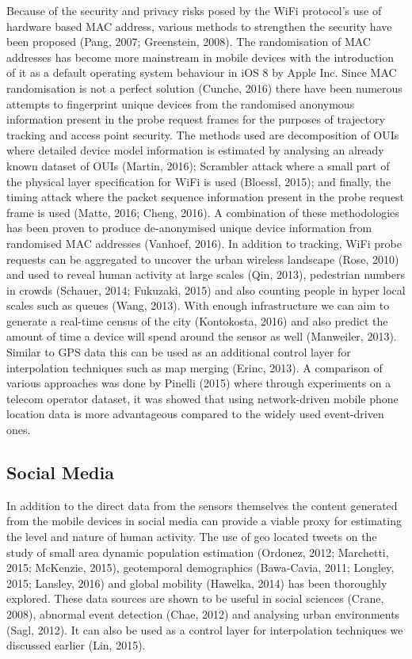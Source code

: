 Because of the security and privacy risks posed by the WiFi protocol’s use of hardware based MAC address, various methods to strengthen the security have been proposed (Pang, 2007; Greenstein, 2008).
The randomisation of MAC addresses has become more mainstream in mobile devices with the introduction of it as a default operating system behaviour in iOS 8 by Apple Inc.
Since MAC randomisation is not a perfect solution (Cunche, 2016) there have been numerous attempts to fingerprint unique devices from the randomised anonymous information present in the probe request frames for the purposes of trajectory tracking and access point security.
The methods used are decomposition of OUIs where detailed device model information is estimated by analysing an already known dataset of OUIs (Martin, 2016); Scrambler attack where a small part of the physical layer specification for WiFi is used (Bloessl, 2015); and finally, the timing attack where the packet sequence information present in the probe request frame is used (Matte, 2016; Cheng, 2016).
A combination of these methodologies has been proven to produce de-anonymised unique device information from randomised MAC addresses (Vanhoef, 2016).
In addition to tracking, WiFi probe requests can be aggregated to uncover the urban wireless landscape (Rose, 2010) and used to reveal human activity at large scales (Qin, 2013), pedestrian numbers in crowds (Schauer, 2014; Fukuzaki, 2015) and also counting people in hyper local scales such as queues (Wang, 2013).
With enough infrastructure we can aim to generate a real-time census of the city (Kontokosta, 2016) and also predict the amount of time a device will spend around the sensor as well (Manweiler, 2013).
Similar to GPS data this can be used as an additional control layer for interpolation techniques such as map merging (Erinc, 2013).
A comparison of various approaches was done by Pinelli (2015) where through experiments on a telecom operator dataset, it was showed that using network-driven mobile phone location data is more advantageous compared to the widely used event-driven ones.

\subsection{Social Media}

In addition to the direct data from the sensors themselves the content generated from the mobile devices in social media can provide a viable proxy for estimating the level and nature of human activity.
The use of geo located tweets on the study of small area dynamic population estimation (Ordonez, 2012; Marchetti, 2015; McKenzie, 2015), geotemporal demographics (Bawa-Cavia, 2011; Longley, 2015; Lansley, 2016) and global mobility (Hawelka, 2014) has been thoroughly explored.
These data sources are shown to be useful in social sciences (Crane, 2008), abnormal event detection (Chae, 2012) and analysing urban environments (Sagl, 2012).
It can also be used as a control layer for interpolation techniques we discussed earlier (Lin, 2015).



